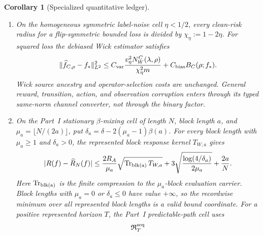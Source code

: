 \documentclass[11pt]{article}
\numberwithin{section}{part}
\theoremstyle{plain}
\newtheorem{corollary}[corollary]{Corollary}
\theoremstyle{definition}
\theoremstyle{remark}
\begin{document}
\begin{corollary}[Specialized quantitative ledger]
\begin{enumerate}[label=\textup{(\roman*)}]
derived target-band separation, and define
\[
 d_{\rm DK}:=
 \begin{cases}
  2\varepsilon_T/g_*,&g_*>2\varepsilon_T,\\
  1,&g_*\le2\varepsilon_T.
 \end{cases}
\]
Davis--Kahan gives the first value, while the universal distance bound for
orthogonal projectors gives the second
\citep{DavisKahan1970}.  Thus the projector discrepancy is always bounded by
\(d_{\rm DK}\), without a spectral-gap assumption.  Smoothed bands use the
recordwise minimum of this value and their represented operator-Lipschitz
value.  The
result propagates to capture, effective dimension, action-safe capacity, and
every declared Lipschitz certificate coordinate.
\item On the homogeneous symmetric label-noise cell \(\eta<1/2\), every
clean-risk radius for a flip-symmetric bounded loss is divided by
\(\chi_\eta:=1-2\eta\).  For squared loss the debiased
Wick estimator satisfies
\begin{equation}
 \label{eq:wick-debiased-krr}
 \|\widehat f_{C,\rho}-f_*\|_{L^2}^2
 \le C_{\rm var}\frac{v_\eta^2N_W^C(\lambda,\rho)}
 {\chi_\eta^2m}
 +C_{\rm bias}B_C(\rho;f_*).
\end{equation}
Wick source ancestry and operator-selection costs are unchanged.  General
reward, transition, action, and observation corruption enters through its
typed same-norm channel converter, not through the binary factor.
\item On the Part~I stationary \(\beta\)-mixing cell of length
\(N\), block length \(a\), and
\(\mu_a=\lfloor N/(2a)\rfloor\), put
\(\delta_a=\delta-2(\mu_a-1)\beta(a)\).  For every block length with
\(\mu_a\ge1\) and \(\delta_a>0\), the represented block response kernel
\(T_{W,a}\) gives
\begin{equation}
 \label{eq:wick-mixing-block-bound}
 |R(f)-\widehat R_N(f)|
 \le\frac{2R_A}{\mu_a}\sqrt{\operatorname{Tr}_{\rm blk(a)}T_{W,a}}
 +3\sqrt{\frac{\log(4/\delta_a)}{2\mu_a}}
 +\frac{2a}{N}.
\end{equation}
Here \(\operatorname{Tr}_{\rm blk(a)}\) is the finite compression to the
\(\mu_a\)-block evaluation carrier.  Block lengths with \(\mu_a=0\) or
\(\delta_a\le0\) have value \(+\infty\), so the recordwise minimum over all
represented block lengths is a valid bound coordinate.  For a positive
represented horizon \(T\), the Part~I predictable-path cell uses
\begin{equation}
 \label{eq:wick-sequential-radius}
 \mathfrak R_T^{\rm seq}

\end{equation}
\end{enumerate}
\end{corollary}
\end{document}
